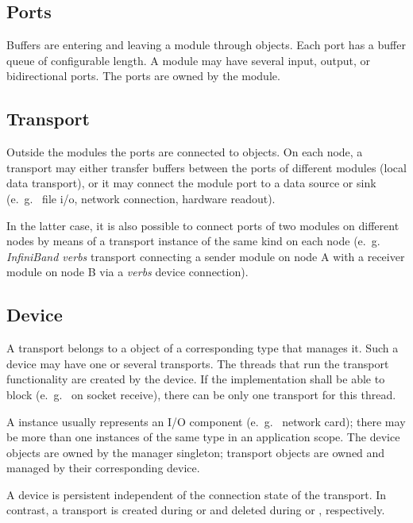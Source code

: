 \subsection{Ports}
Buffers are entering and leaving a module through 
  objects. 
Each port has a buffer queue of configurable length.
A module may have several input, output,  
or bidirectional ports. The ports are owned by the module.

\subsection{Transport}
Outside the modules the ports are connected to 
  objects.
On each node, a transport may either transfer buffers between 
the ports of different modules (local data transport), or it may connect the module port to a data 
source or sink (e.~g.~ file i/o, network connection, hardware readout).

In the latter case, it is also possible  to connect ports of two modules on 
different nodes by means of a transport instance of the same kind on 
each node (e.~g.~ {\em InfiniBand verbs} transport connecting a sender module on node A with a receiver
module on node B via a {\em verbs} device connection).

\subsection{Device}
A transport belongs to a  
 object of a 
corresponding type that manages it. Such a device may have one or several transports.  
The threads that run the transport functionality are
created by the device. If the  implementation 
shall be able to block (e.~g.~ on socket receive), there can be only 
one transport for this thread. 

A  instance usually represents an I/O component (e.~g.~ network card); 
there may be more than one  instances of the same 
type in an application scope. 
The device objects are owned by the manager 
singleton; transport objects are owned and managed by their corresponding device.  

A device is persistent independent of the connection state 
of the transport. In contrast, a transport is created 
during  or 
and deleted during  or , respectively. 

